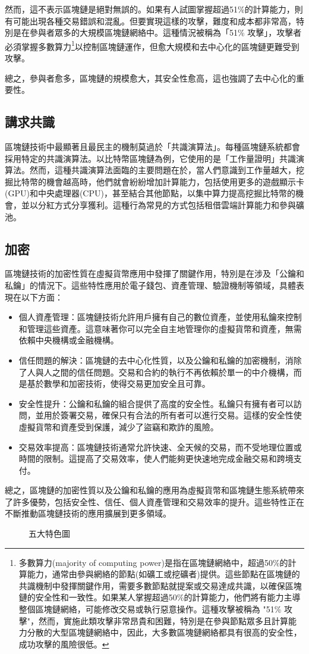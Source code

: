 \documentclass[12pt, a4paper]{article}
\begin{document}
然而，這不表示區塊鏈是絕對無誤的。如果有人試圖掌握超過51\%的計算能力，則有可能出現各種交易錯誤和混亂。但要實現這樣的攻擊，難度和成本都非常高，特別是在參與者眾多的大規模區塊鏈網絡中。這種情況被稱為「51\% 攻擊」，攻擊者必須掌握多數算力\footnote {多數算力(majority of computing power)是指在區塊鏈網絡中，超過50\%的計算能力，通常由參與網絡的節點(如礦工或挖礦者)提供。這些節點在區塊鏈的共識機制中發揮關鍵作用，需要多數節點就提案或交易達成共識，以確保區塊鏈的安全性和一致性。如果某人掌握超過50\%的計算能力，他們將有能力主導整個區塊鏈網絡，可能修改交易或執行惡意操作。這種攻擊被稱為 "51\% 攻擊"，然而，實施此類攻擊非常昂貴和困難，特別是在參與節點眾多且計算能力分散的大型區塊鏈網絡中，因此，大多數區塊鏈網絡都具有很高的安全性，成功攻擊的風險很低。}以控制區塊鏈運作，但愈大規模和去中心化的區塊鏈更難受到攻擊。

總之，參與者愈多，區塊鏈的規模愈大，其安全性愈高，這也強調了去中心化的重要性。
\subsection{\BB 講求共識}
區塊鏈技術中最顯著且最民主的機制莫過於「共識演算法」。每種區塊鏈系統都會採用特定的共識演算法。以比特幣區塊鏈為例，它使用的是「工作量證明」共識演算法。然而，這種共識演算法面臨的主要問題在於，當人們意識到工作量越大，挖掘比特幣的機會越高時，他們就會紛紛增加計算能力，包括使用更多的遊戲顯示卡(GPU)和中央處理器(CPU)，甚至結合其他節點，以集中算力提高挖掘比特幣的機會，並以分紅方式分享獲利。這種行為常見的方式包括租借雲端計算能力和參與礦池。
\subsection{\WW 加密}
區塊鏈技術的加密性質在虛擬貨幣應用中發揮了關鍵作用，特別是在涉及「公鑰和私鑰」的情況下。這些特性應用於電子錢包、資產管理、驗證機制等領域，具體表現在以下方面：
\begin{itemize}
\item 個人資產管理：區塊鏈技術允許用戶擁有自己的數位資產，並使用私鑰來控制和管理這些資產。這意味著你可以完全自主地管理你的虛擬貨幣和資產，無需依賴中央機構或金融機構。
\item 信任問題的解決：區塊鏈的去中心化性質，以及公鑰和私鑰的加密機制，消除了人與人之間的信任問題。交易和合約的執行不再依賴於單一的中介機構，而是基於數學和加密技術，使得交易更加安全且可靠。
\item 安全性提升：公鑰和私鑰的組合提供了高度的安全性。私鑰只有擁有者可以訪問，並用於簽署交易，確保只有合法的所有者可以進行交易。這樣的安全性使虛擬貨幣和資產受到保護，減少了盜竊和欺詐的風險。
\item 交易效率提高：區塊鏈技術通常允許快速、全天候的交易，而不受地理位置或時間的限制。這提高了交易效率，使人們能夠更快速地完成金融交易和跨境支付。
\end{itemize}
總之，區塊鏈的加密性質以及公鑰和私鑰的應用為虛擬貨幣和區塊鏈生態系統帶來了許多優勢，包括安全性、信任、個人資產管理和交易效率的提升。這些特性正在不斷推動區塊鏈技術的應用擴展到更多領域。
\vspace{0.5cm}
\begin{figure}[h]
    \caption{五大特色圖}
    \label{fig:five-characteristic}
\end{figure}
\end{document}
